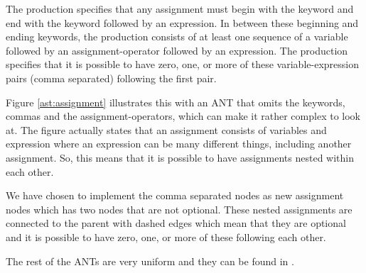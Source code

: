 
The production specifies that any assignment must begin with the keyword
 and end with the keyword  followed by an expression. In
between these beginning and ending keywords, the production consists of at least
one sequence of a variable followed by an assignment-operator followed by an
expression. The production specifies that it is possible to have zero, one, or
more of these variable-expression pairs (comma separated) following the first
pair.



Figure \ref{ast:assignment} illustrates this with an ANT that omits the
keywords, commas and the assignment-operators, which can make it rather complex
to look at. The figure actually states that an assignment consists of variables
and expression where an expression can be many different things, including
another assignment. So, this means that it is possible to have assignments
nested within each other. 

We have chosen to implement the comma separated nodes as new assignment nodes
which has two nodes that are not optional. These nested assignments are
connected to the parent with dashed edges which mean that they are optional and
it is possible to have zero, one, or more of these following each other.

The rest of the ANTs are very uniform and they can be found in .
